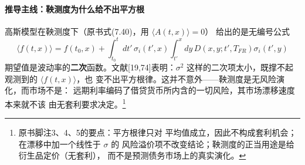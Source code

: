 \paragraph{推导主线：鞅测度为什么给不出平方根}
高斯模型在鞅测度下（原书式(7.40)，用 $\langle A(t,x)\rangle=0$）
给出的是无编号公式
\begin{equation*}
\langle f(t,x)\rangle=f(t_{0},x)+
\int_{t_{0}}^{t}dt'\,\sigma_{i}(t',x)
\int_{t'}^{x}dy\,D(x,y;t',T_{FR})\sigma_{i}(t',y)
\end{equation*}
期望值是波动率的\textbf{二次}函数。文献[19,74]表明：$\sigma^{2}$
这样的二次项太小，既撑不起观测到的 $\langle f(t,x)\rangle$，也
变不出平方根律。这并不意外——鞅测度是无风险演化，而市场不是：
远期利率编码了借贷货币所内含的一切风险，其市场漂移速度本来就不该
由无套利要求决定。\footnote{原书脚注3、4、5的要点：平方根律只对
平均值成立，因此不构成套利机会；在漂移中加一个线性于 $\sigma$ 的
风险溢价项不改变结论；鞅测度的正当用途是给衍生品定价（无套利），
而不是预测债务市场上的真实演化。}

